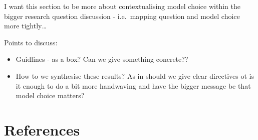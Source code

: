 \documentclass[
]{article}
\providecommand{\tightlist}{%
  \setlength{\itemsep}{0pt}\setlength{\parskip}{0pt}}
\begin{document}
I want this section to be more about contextualising model choice within
the bigger research question discussion - i.e.~mapping question and
model choice more tightly\ldots{}

Points to discuss:

\begin{itemize}
\tightlist
\item
  Guidlines - as a box? Can we give something concrete??
\item
  How to we synthesise these results? As in should we give clear
  directives ot is it enough to do a bit more handwaving and have the
  bigger message be that model choice matters?
\end{itemize}

\section*{References}\label{references}
\end{document}
